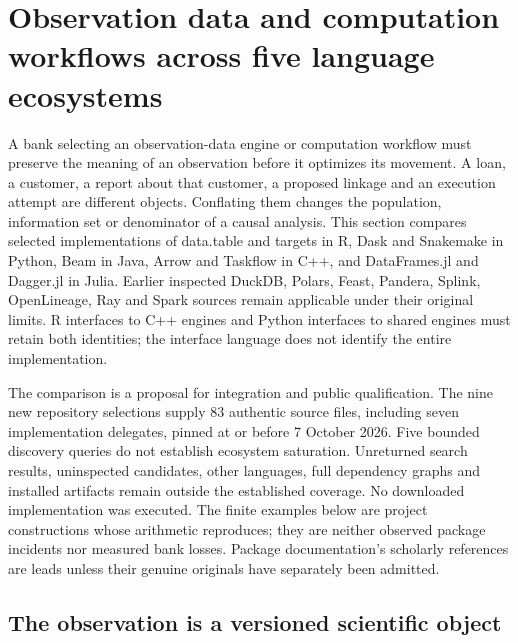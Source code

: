 \section[Observation data and computation workflows]{Observation data and computation workflows across five language ecosystems}
\label{sec:exec25-dww}

A bank selecting an observation-data engine or computation workflow must preserve the meaning of an observation before it optimizes its movement. A loan, a customer, a report about that customer, a proposed linkage and an execution attempt are different objects. Conflating them changes the population, information set or denominator of a causal analysis. This section compares selected implementations of data.table and targets in R, Dask and Snakemake in Python, Beam in Java, Arrow and Taskflow in C++, and DataFrames.jl and Dagger.jl in Julia. Earlier inspected DuckDB, Polars, Feast, Pandera, Splink, OpenLineage, Ray and Spark sources remain applicable under their original limits. R interfaces to C++ engines and Python interfaces to shared engines must retain both identities; the interface language does not identify the entire implementation.\citep{exec25_dww_datatable,exec25_dww_targets,exec25_dww_dask,exec25_dww_snakemake,exec25_dww_beam,exec25_dww_arrow,exec25_dww_taskflow,exec25_dww_dataframes,exec25_dww_dagger,exec19_duckdb_source,exec23_polars_sources,exec25_otm_spark}

The comparison is a proposal for integration and public qualification. The nine new repository selections supply 83 authentic source files, including seven implementation delegates, pinned at or before 7 October 2026. Five bounded discovery queries do not establish ecosystem saturation. Unreturned search results, uninspected candidates, other languages, full dependency graphs and installed artifacts remain outside the established coverage. No downloaded implementation was executed. The finite examples below are project constructions whose arithmetic reproduces; they are neither observed package incidents nor measured bank losses. Package documentation's scholarly references are leads unless their genuine originals have separately been admitted.\citep{exec25_dww_choice}

\subsection{The observation is a versioned scientific object}

